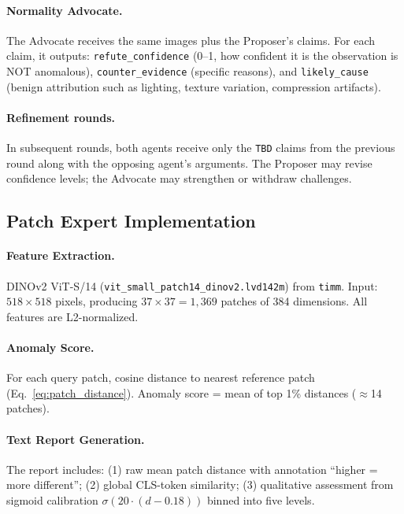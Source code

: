 \paragraph{Normality Advocate.}
The Advocate receives the same images plus the Proposer's claims. For each claim, it outputs: \texttt{refute\_confidence} (0--1, how confident it is the observation is NOT anomalous), \texttt{counter\_evidence} (specific reasons), and \texttt{likely\_cause} (benign attribution such as lighting, texture variation, compression artifacts).

\paragraph{Refinement rounds.}
In subsequent rounds, both agents receive only the \texttt{TBD} claims from the previous round along with the opposing agent's arguments. The Proposer may revise confidence levels; the Advocate may strengthen or withdraw challenges.

\subsection{Patch Expert Implementation}
\label{app:patch_expert}

\paragraph{Feature Extraction.}
DINOv2 ViT-S/14 (\texttt{vit\_small\_patch14\_dinov2.lvd142m}) from \texttt{timm}. Input: $518 \times 518$ pixels, producing $37 \times 37 = 1{,}369$ patches of 384 dimensions. All features are L2-normalized.

\paragraph{Anomaly Score.}
For each query patch, cosine distance to nearest reference patch (Eq.~\ref{eq:patch_distance}). Anomaly score = mean of top 1\% distances ($\approx$14 patches).

\paragraph{Text Report Generation.}
The report includes: (1) raw mean patch distance with annotation ``higher = more different''; (2) global CLS-token similarity; (3) qualitative assessment from sigmoid calibration $\sigma(20 \cdot (d - 0.18))$ binned into five levels.

